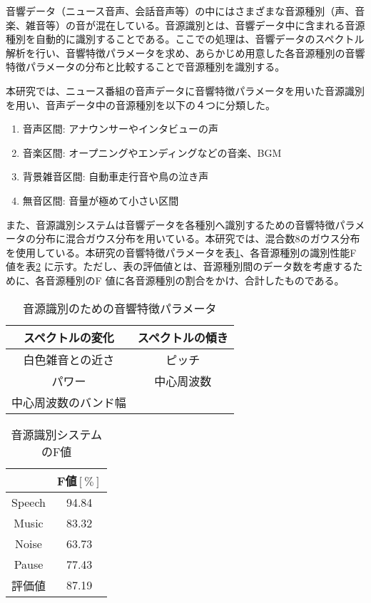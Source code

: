 \renewcommand{\labelenumi}{(\arabic{enumi})}
音響データ（ニュース音声、会話音声等）の中にはさまざまな音源種別（声、音楽、雑音等）の音が混在している。音源識別とは、音響データ中に含まれる音源種別を自動的に識別することである。ここでの処理は、音響データのスペクトル解析を行い、音響特徴パラメータを求め、あらかじめ用意した各音源種別の音響特徴パラメータの分布と比較することで音源種別を識別する。\par
本研究では、ニュース番組の音声データに音響特徴パラメータを用いた音源識別\cite{shimae_9} を用い、音声データ中の音源種別を以下の４つに分類した。

\begin{enumerate}
\item 音声区間: アナウンサーやインタビューの声
\item 音楽区間: オープニングやエンディングなどの音楽、BGM
\item 背景雑音区間: 自動車走行音や鳥の泣き声
\item 無音区間: 音量が極めて小さい区間
\end{enumerate}

また、音源識別システムは音響データを各種別へ識別するための音響特徴パラメータの分布に混合ガウス分布を用いている。本研究では、混合数8のガウス分布を使用している。本研究の音響特徴パラメータを表\ref{table:feature_devide_audio}、各音源種別の識別性能F 値を表\ref{ad_F} に示す。ただし、表の評価値とは、音源種別間のデータ数を考慮するために、各音源種別のF 値に各音源種別の割合をかけ、合計したものである。

\begin{table}[H]
  \begin{center}
    \caption{音源識別のための音響特徴パラメータ}
    \label{table:feature_devide_audio}
    \begin{tabular}{|c|c|} \hline
      スペクトルの変化 & スペクトルの傾き\\ \hline
      白色雑音との近さ & ピッチ  \\ \hline
      パワー & 中心周波数 \\  \hline
      中心周波数のバンド幅 &   \\ \hline
    \end{tabular}
  \end{center}
\end{table}

\begin{table}[H]
  \begin{center}
    \caption{音源識別システムのF値}
    \label{ad_F}
    \begin{tabular}{|c||c|} \hline
       & F値$[\%]$\\ \hline
      Speech & 94.84  \\ \hline
      Music & 83.32 \\ \hline
      Noise & 63.73  \\ \hline
      Pause & 77.43 \\ \hline
      評価値 & 87.19 \\ \hline
    \end{tabular}
  \end{center}
\end{table}



